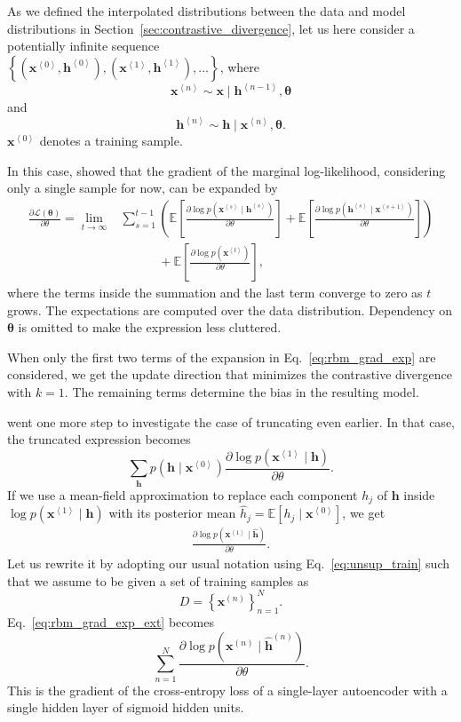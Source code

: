 \documentclass{now}
\newcommand{\qt}[1]{\left<#1\right>}
\newcommand{\vect}[1]{\mathbf{#1}}
\newcommand{\vects}[1]{\boldsymbol{#1}}
\newcommand{\vh}[0]{\vect{h}}
\newcommand{\vx}[0]{\vect{x}}
\newcommand{\TT}[0]{{\vects{\theta}}}
\newcommand{\LL}[0]{\mathcal{L}}
\newcommand{\E}[0]{\mathbb{E}}
\begin{document}
As we defined the interpolated distributions between the
data and model distributions in
Section~\ref{sec:contrastive_divergence}, let us here
consider a potentially infinite sequence \\
$\left\{
\left(\vx^{\qt{0}}, \vh^{\qt{0}}\right),
\left(\vx^{\qt{1}},
\vh^{\qt{1}}\right), \dots \right\}$, where
\[
\vx^{\qt{n}} \sim \vx \mid \vh^{\qt{n-1}}, \TT
\]
and
\[
\vh^{\qt{n}} \sim \vh \mid \vx^{\qt{n}}, \TT.
\]
$\vx^{\qt{0}}$ denotes a training sample.

In this case, \citet{Bengio2009} showed that the gradient of
the marginal log-likelihood, considering only a single
sample for now, can be expanded by
\begin{align}
    \label{eq:rbm_grad_exp}
    \frac{\partial \LL(\TT)}{\partial \theta} = 
    \lim_{t\to\infty}&
    \sum_{s=1}^{t-1} \left( \E\left[ \frac{\partial \log
    p(\vx^{\qt{s}} \mid \vh^{\qt{s}})}{\partial \theta}
    \right]  + \E \left[ \frac{\partial \log p(\vh^{\qt{s}}
    \mid \vx^{\qt{s+1}} )}{\partial \theta} \right]
    \right) 
    \nonumber \\
    &\phantom{\sum_{s=1}^{t-1}} + \E \left[ \frac{\partial \log
    p(\vx^{\qt{t}})}{\partial \theta} 
    \right],
\end{align}
where the terms inside the summation and the last term
converge to zero as $t$ grows. The expectations are computed
over the data distribution. Dependency on $\TT$ is omitted
to make the expression less cluttered.

When only the first two terms of the expansion in
Eq.~\eqref{eq:rbm_grad_exp} are considered, we get the
update direction that minimizes the contrastive divergence
with $k=1$.
The remaining terms determine the bias in the resulting
model.

\citet{Bengio2009} went one more step to investigate the
case of truncating even earlier. In that case, the truncated
expression becomes
\[
\sum_{\vh} p(\vh \mid \vx^{\qt{0}}) \frac{\partial \log
p(\vx^{\qt{1}} \mid \vh)}{\partial \theta}.
\]
If we use a mean-field approximation to replace
each component $h_j$ of $\vh$ inside $\log
p(\vx^{\qt{1}} \mid \vh)$ with its posterior mean $\hat{h}_j =
\E\left[ h_j \mid \vx^{\qt{0}} \right]$, we get
\begin{align}
    \label{eq:rbm_grad_exp_ext}
    \frac{\partial \log p(\vx^{\qt{1}} \mid \hat{\vh})}{\partial \theta}.
\end{align}
Let us rewrite it by adopting our usual notation using
Eq.~\eqref{eq:unsup_train} such that we assume to be given
a set of training samples as
\[
D=\left\{ \vx^{(n)} \right\}_{n=1}^N.
\]
Eq.~\eqref{eq:rbm_grad_exp_ext} becomes
\[
\sum_{n=1}^N \frac{\partial \log p(\vx^{(n)} \mid
\hat{\vh}^{(n)})}{\partial \theta}.
\]
This is the gradient of
the cross-entropy loss of a single-layer autoencoder with a
single hidden layer of sigmoid hidden units.
\end{document}
